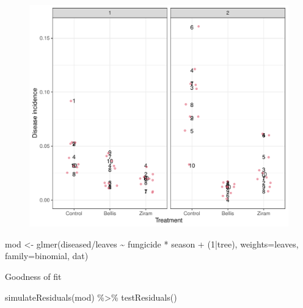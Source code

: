 \documentclass[
  letterpaper,
  DIV=11,
  numbers=noendperiod]{scrreport}
\newenvironment{Shaded}{\begin{snugshade}}{\end{snugshade}}
\newcommand{\AttributeTok}[1]{\textcolor[rgb]{0.40,0.45,0.13}{#1}}
\newcommand{\DecValTok}[1]{\textcolor[rgb]{0.68,0.00,0.00}{#1}}
\newcommand{\FunctionTok}[1]{\textcolor[rgb]{0.28,0.35,0.67}{#1}}
\newcommand{\NormalTok}[1]{\textcolor[rgb]{0.00,0.23,0.31}{#1}}
\newcommand{\OtherTok}[1]{\textcolor[rgb]{0.00,0.23,0.31}{#1}}
\newcommand{\SpecialCharTok}[1]{\textcolor[rgb]{0.37,0.37,0.37}{#1}}
\begin{document}
\begin{figure}[H]

{\centering \includegraphics{in_field_files/figure-pdf/unnamed-chunk-4-1.pdf}

}

\end{figure}

\begin{Shaded}
\begin{Highlighting}[]
\NormalTok{mod }\OtherTok{\textless{}{-}} \FunctionTok{glmer}\NormalTok{(diseased}\SpecialCharTok{/}\NormalTok{leaves }\SpecialCharTok{\textasciitilde{}}\NormalTok{ fungicide }\SpecialCharTok{*}\NormalTok{ season }\SpecialCharTok{+}\NormalTok{ (}\DecValTok{1}\SpecialCharTok{|}\NormalTok{tree),}
             \AttributeTok{weights=}\NormalTok{leaves, }\AttributeTok{family=}\NormalTok{binomial, dat)}
\end{Highlighting}
\end{Shaded}

Goodness of fit

\begin{Shaded}
\begin{Highlighting}[]
\FunctionTok{simulateResiduals}\NormalTok{(mod) }\SpecialCharTok{\%\textgreater{}\%} \FunctionTok{testResiduals}\NormalTok{()}
\end{Highlighting}
\end{Shaded}
\end{document}
